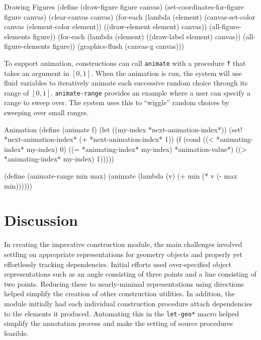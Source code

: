 \begin{code-listing}
[label=draw-figure]
{Drawing Figures}
(define (draw-figure figure canvas)
  (set-coordinates-for-figure figure canvas)
  (clear-canvas canvas)
  (for-each
   (lambda (element)
     (canvas-set-color canvas (element-color element))
     ((draw-element element) canvas))
   (all-figure-elements figure))
  (for-each
   (lambda (element)
     ((draw-label element) canvas))
   (all-figure-elements figure))
  (graphics-flush (canvas-g canvas)))
\end{code-listing}

To support animation, constructions can call \texttt{animate} with a
procedure \texttt{f} that takes an argument in $[0, 1]$. When the
animation is run, the system will use fluid variables to iteratively
animate each successive random choice through its range of
$[0,1]$. \texttt{animate-range} provides an example where a user can
specify a range to sweep over. The system uses this to ``wiggle''
random choices by sweeping over small ranges.

\enlargethispage*{\baselineskip}

\begin{code-listing}
[label=animation]
{Animation}
(define (animate f)
  (let ((my-index *next-animation-index*))
    (set! *next-animation-index* (+ *next-animation-index* 1))
    (f (cond ((< *animating-index* my-index) 0)
             ((= *animating-index* my-index) *animation-value*)
             ((> *animating-index* my-index) 1)))))

(define (animate-range min max)
  (animate (lambda (v) (+ min (* v (- max min))))))
\end{code-listing}

\section{Discussion}

In creating the imperative construction module, the main challenges
involved settling on appropriate representations for geometry objects
and properly yet effortlessly tracking dependencies. Initial efforts
used over-specified object representations such as an angle consisting
of three points and a line consisting of two points. Reducing these to
nearly-minimal representations using directions helped simplify the
creation of other construction utilities. In addition, the module
initially had each individual construction procedure attach
dependencies to the elements it produced. Automating this in the
\texttt{let-geo*} macro helped simplify the annotation process and
make the setting of source procedures feasible.

